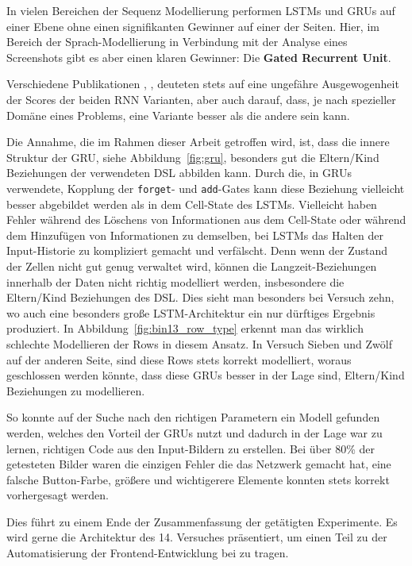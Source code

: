 \documentclass[pdftex,a4paper,halfparskip, article]{scrartcl}
\begin{document}
In vielen Bereichen der Sequenz Modellierung performen LSTMs und GRUs auf einer Ebene ohne einen signifikanten Gewinner auf einer der Seiten. Hier, im Bereich der Sprach-Modellierung in Verbindung mit der Analyse eines Screenshots gibt es aber einen klaren Gewinner: Die \textbf{Gated Recurrent Unit}.

Verschiedene Publikationen \cite{paperGRUComparison}, \cite{lstmSearchSpace}, \cite{colahsBlogLSTM} deuteten stets auf eine ungefähre Ausgewogenheit der Scores der beiden RNN Varianten, aber auch darauf, dass, je nach spezieller Domäne eines Problems, eine Variante besser als die andere sein kann.

Die Annahme, die im Rahmen dieser Arbeit getroffen wird, ist, dass die innere Struktur der GRU, siehe Abbildung~\ref{fig:gru}, besonders gut die Eltern/Kind Beziehungen der verwendeten DSL abbilden kann. Durch die, in GRUs verwendete, Kopplung der \texttt{forget}- und \texttt{add}-Gates kann diese Beziehung vielleicht besser abgebildet werden als in dem Cell-State des LSTMs. Vielleicht haben Fehler während des Löschens von Informationen aus dem Cell-State oder während dem Hinzufügen von Informationen zu demselben, bei LSTMs das Halten der Input-Historie zu kompliziert gemacht und verfälscht. Denn wenn der Zustand der Zellen nicht gut genug verwaltet wird, können die Langzeit-Beziehungen innerhalb der Daten nicht richtig modelliert werden, insbesondere die Eltern/Kind Beziehungen des DSL. Dies sieht man besonders bei Versuch zehn, wo auch eine besonders große LSTM-Architektur ein nur dürftiges Ergebnis produziert. In Abbildung~\ref{fig:bin13_row_type} erkennt man das wirklich schlechte Modellieren der Rows in diesem Ansatz. In Versuch Sieben und Zwölf auf der anderen Seite, sind diese Rows stets korrekt modelliert, woraus geschlossen werden könnte, dass diese GRUs besser in der Lage sind, Eltern/Kind Beziehungen zu modellieren. 

So konnte auf der Suche nach den richtigen Parametern ein Modell gefunden werden, welches den Vorteil der GRUs nutzt und dadurch in der Lage war zu lernen, richtigen Code aus den Input-Bildern zu erstellen. Bei über 80\% der getesteten Bilder waren die einzigen Fehler die das Netzwerk gemacht hat, eine falsche Button-Farbe, größere und wichtigerere Elemente konnten stets korrekt vorhergesagt werden. 

Dies führt zu einem Ende der Zusammenfassung der getätigten Experimente. Es wird gerne die Architektur des 14. Versuches präsentiert, um einen Teil zu der Automatisierung der Frontend-Entwicklung bei zu tragen.
\end{document}
